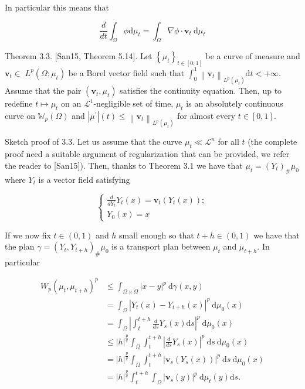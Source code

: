 \documentclass[10pt]{article}
\begin{document}
In particular this means that

\[
\frac{d}{d t} \int_{\Omega} \phi \mathrm{d} \mu_{t}=\int_{\Omega} \nabla \phi \cdot \mathbf{v}_{t} \mathrm{~d} \mu_{t}
\]

Theorem 3.3. [San15, Theorem 5.14]. Let \(\left\{\mu_{t}\right\}_{t \in[0,1]}\) be a curve of measure and \(\mathbf{v}_{t} \in\) \(L^{p}\left(\Omega ; \mu_{t}\right)\) be a Borel vector field such that \(\int_{0}^{1}\left\|\mathbf{v}_{t}\right\|_{L^{p}\left(\mu_{t}\right)} \mathrm{d} t<+\infty\). Assume that the pair \(\left(\mathbf{v}_{t}, \mu_{t}\right)\) satisfies the continuity equation. Then, up to redefine \(t \mapsto \mu_{t}\) on an \(\mathcal{L}^{1}\)-negligible set of time, \(\mu_{t}\) is an absolutely continuous curve on \(\mathbb{W}_{p}(\Omega)\) and \(\left|\mu^{\prime}\right|(t) \leq\left\|\mathbf{v}_{t}\right\|_{L^{p}\left(\mu_{t}\right)}\) for almost every \(t \in[0,1]\).

Sketch proof of 3.3. Let us assume that the curve \(\mu_{t} \ll \mathcal{L}^{n}\) for all \(t\) (the complete proof need a suitable argument of regularization that can be provided, we refer the reader to [San15]). Then, thanks to Theorem 3.1 we have that \(\mu_{t}=\left(Y_{t}\right)_{\#} \mu_{0}\) where \(Y_{t}\) is a vector field satisfying

\[
\left\{\begin{array}{l}
\frac{d}{d Y_{t}} Y_{t}(x)=\mathbf{v}_{t}\left(Y_{t}(x)\right) ; \\
Y_{0}(x)=x
\end{array}\right.
\]

If we now fix \(t \in(0,1)\) and \(h\) small enough so that \(t+h \in(0,1)\) we have that the plan \(\gamma=\left(Y_{t}, Y_{t+h}\right)_{\#} \mu_{0}\) is a transport plan between \(\mu_{t}\) and \(\mu_{t+h}\). In particular

\[
\begin{aligned}
W_{p}\left(\mu_{t}, \mu_{t+h}\right)^{p} & \leq \int_{\Omega \times \Omega}|x-y|^{p} \mathrm{~d} \gamma(x, y) \\
& =\int_{\Omega}\left|Y_{t}(x)-Y_{t+h}(x)\right|^{p} \mathrm{~d} \mu_{0}(x) \\
& =\int_{\Omega}\left|\int_{t}^{t+h} \frac{d}{d s} Y_{s}(x) \mathrm{d} s\right|^{p} \mathrm{~d} \mu_{0}(x) \\
& \leq|h|^{\frac{p}{q}} \int_{\Omega} \int_{t}^{t+h}\left|\frac{d}{d s} Y_{s}(x)\right|^{p} \mathrm{~d} s \mathrm{~d} \mu_{0}(x) \\
& =|h|^{\frac{p}{q}} \int_{\Omega} \int_{t}^{t+h}\left|\mathbf{v}_{s}\left(Y_{s}(x)\right)\right|^{p} \mathrm{~d} s \mathrm{~d} \mu_{0}(x) \\
& =|h|^{\frac{p}{q}} \int_{t}^{t+h} \int_{\Omega}\left|\mathbf{v}_{s}(y)\right|^{p} \mathrm{~d} \mu_{t}(y) \mathrm{d} s .
\end{aligned}
\]
\end{document}
